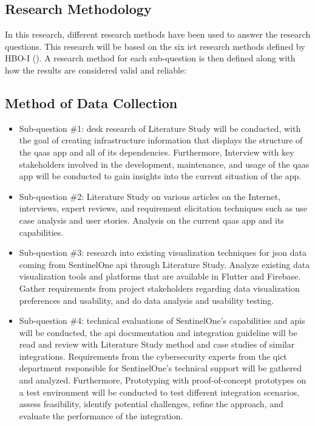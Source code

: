 \begin{multicols}{2}
      \section{Research Methodology}
      In this research, different research methods have been used to answer the research questions. This research
      will be based on the six \acrshort{ict} research methods defined by HBO-I (\cite{ictresearchmethods}). A
      research method for each sub-question is then defined along with how the results are considered valid and
      reliable:
      \subsection{Method of Data Collection}
      \begin{itemize}[label=-]
            \item Sub-question \#1: desk research of Literature Study will be conducted, with the goal of creating
                  infrastructure information that displays the structure of the \acrshort{qaas} app and all of its
                  dependencies. Furthermore, Interview with key stakeholders involved in the  development, maintenance,
                  and usage of the \acrshort{qaas} app will be conducted to gain insights into the current situation
                  of the app.
            \item Sub-question \#2: Literature Study on various articles on the Internet, interviews, expert reviews,
                  and requirement elicitation techniques such as use case analysis and user stories. Analysis on the
                  current \acrshort{qaas} app and its capabilities.
            \item Sub-question \#3: research into existing visualization techniques for \acrshort{json} data coming from
                  SentinelOne \acrshort{api} through Literature Study. Analyze existing data visualization tools and
                  platforms that are available in Flutter and Firebase. Gather requirements from project stakeholders
                  regarding data visualization preferences and usability, and do data analysis and usability testing.
            \item Sub-question \#4: technical evaluations of SentinelOne's capabilities and \acrshort{api}s will
                  be conducted, the \acrshort{api} documentation and integration guideline will be read and review
                  with Literature Study method and case studies of similar integrations. Requirements from the
                  cybersecurity experts from the \acrshort{qict} department responsible for SentinelOne's technical
                  support will be gathered and analyzed. Furthermore, Prototyping with proof-of-concept prototypes
                  on a test environment will be conducted to test different integration scenarios, assess feasibility,
                  identify potential challenges, refine the approach, and evaluate the performance of the integration.

\end{itemize}
\end{multicols}
